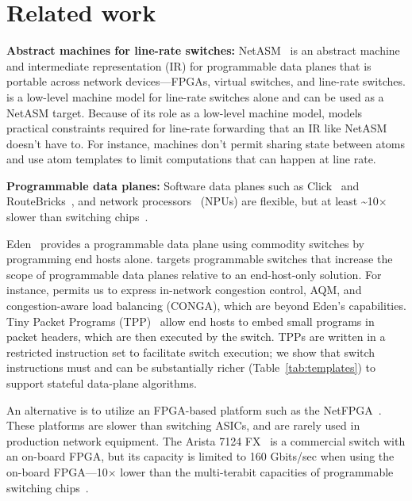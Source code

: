 \section{Related work}
\label{s:related}
\textbf{Abstract machines for line-rate switches:}
NetASM~\cite{netasm} is an abstract machine and intermediate representation
(IR) for programmable data planes that is portable across network
devices---FPGAs, virtual switches, and line-rate switches.  \absmachine is a
low-level machine model for line-rate switches alone and can be used as a
NetASM target. Because of its role as a low-level machine model, \absmachine
models practical constraints required for line-rate forwarding that an IR like
NetASM doesn't have to. For instance, \absmachine machines don't permit sharing
state between atoms and use atom templates to limit computations that can
happen at line rate.


\textbf{Programmable data planes:}
Software data planes such as Click~\cite{click} and
RouteBricks~\cite{routebricks}, and network processors~\cite{ixp4xx} (NPUs) are
flexible, but at least \textasciitilde10$\times$ slower than switching
chips~\cite{rmt}.

Eden~\cite{eden} provides a programmable data plane using commodity switches by
programming end hosts alone. \pktlanguage targets programmable switches that
increase the scope of programmable data planes relative to an end-host-only
solution. For instance, \pktlanguage permits us to express in-network
congestion control, AQM, and congestion-aware load balancing (CONGA), which are
beyond Eden's capabilities. Tiny Packet Programs (TPP)~\cite{tpp} allow end
hosts to embed small programs in packet headers, which are then executed by the
switch. TPPs are written in a restricted instruction set to facilitate switch
execution; we show that switch instructions must and can be substantially
richer (Table~\ref{tab:templates}) to support stateful data-plane algorithms.

An alternative is to utilize an FPGA-based platform such as the NetFPGA~\cite{netfpga}.
These platforms are
slower than switching ASICs, and are rarely used in production network
equipment. The Arista 7124 FX~\cite{7124fx} is a commercial switch with an
on-board FPGA, but its capacity is limited to 160 Gbits/sec when using the
on-board FPGA---10$\times$ lower than the multi-terabit capacities of programmable
switching chips~\cite{xpliant, tofino}.

